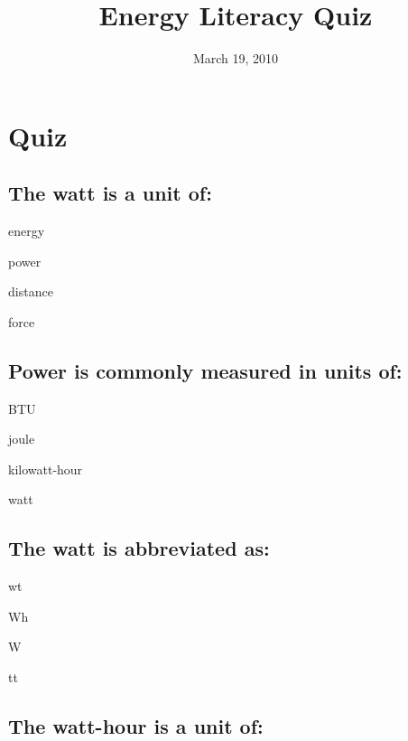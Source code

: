 \documentclass[11pt]{article}
\begin{document}
\title{Energy Literacy Quiz}
\date{March 19, 2010}

\maketitle


\section{Quiz}

\subsection{The watt is a unit of:}

\begin{answer}
	\item energy
	\item power
	\item distance
	\item force
\end{answer}

\subsection{Power is commonly measured in units of:}

\begin{answer}
	\item BTU
	\item joule
	\item kilowatt-hour
	\item watt
\end{answer}

\subsection{The watt is abbreviated as:}

\begin{answer}
	\item wt
	\item Wh
	\item W
	\item tt
\end{answer}

\subsection{The watt-hour is a unit of:}
\end{document}

